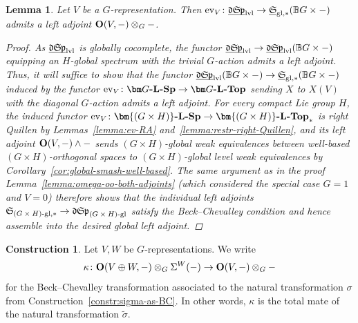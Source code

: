 \documentclass[reqno]{memo-l}
\theoremstyle{mythm}
\newtheorem{lemma}[thm]{Lemma}
\theoremstyle{definition}
\newtheorem{constr}[thm]{Construction}
\numberwithin{equation}{section}
\newcommand{\gl}{\textup{gl}}
\DeclareMathOperator{\ev}{ev}
\newcommand{\cat}[1]{\textbf{\textup{#1}}}
\newcommand{\BGcat}[1]{\mathbb B{#1}}
\newcommand{\ulhelper}[2]{\underline{\setbox0=\hbox{$#1#2$}\dp0=0.4pt \box0\relax}}
\newcommand{\ul}[1]{{\mathpalette\ulhelper{#1}}\hbox{\rule[-2pt]{0pt}{0pt}}}
\let\smashp=\wedge
\newcommand{\mySp}{{\mathfrak S\kern-.5pt\mathfrak p}}
\newcommand{\myLSp}{{\mathfrak d\kern-.25pt}\mySp}
\newcommand{\ulmySplev}{\ul{\myLSp}_\textup{lvl}}
\newcommand{\myS}{{{\mathfrak S\kern-.4pt}}}
\begin{document}
\begin{lemma}
    Let $V$ be a $G$-representation. Then $\ev_V\colon\ulmySplev\to\ul\myS_{\gl,*}({\BGcat{G}\times{-}})$ admits a left adjoint $\cat{O}(V,-)\otimes_G{-}$.
    \begin{proof}
        As $\ulmySplev$ is globally cocomplete, the functor $\ulmySplev\to\ulmySplev(\BGcat{G}\times-)$ equipping an $H$-global spectrum with the trivial $G$-action admits a left adjoint. Thus, it will suffice to show that the functor $\ulmySplev(\BGcat{G}\times-)\to\ul\myS_{\gl,*}(\BGcat{G}\times-)$ induced by the functor $\ev_V\colon\cat{$\bm G$-$\cat{L}$-Sp}\rightarrow\cat{$\bm G$-$\cat{L}$-Top}$ sending $X$ to $X(V)$ with the diagonal $G$-action admits a left adjoint. For every compact Lie group $H$, the induced functor $\ev_V\colon\cat{$\bm{(G\times H)}$-$\cat{L}$-Sp}\to\cat{$\bm{(G\times H)}$-$\cat{L}$-Top}_*$ is right Quillen by Lemmas~\ref{lemma:ev-RA} and~\ref{lemma:restr-right-Quillen}, and its left adjoint $\cat{O}(V,-)\smashp{-}$ sends $(G\times H)$-global weak equivalences between well-based $(G\times H)$-orthogonal spaces to $(G\times H)$-global level weak equivalences by Corollary~\ref{cor:global-smash-well-based}. The same argument as in the proof Lemma~\ref{lemma:omega-oo-both-adjoints} (which considered the special case $G=1$ and $V=0$) therefore shows that the individual left adjoints $\myS_{\text{$(G\times H)$-gl},*}\to\myLSp_\text{$(G\times H)$-gl}$ satisfy the Beck--Chevalley condition and hence assemble into the desired global left adjoint.
    \end{proof}
\end{lemma}

\begin{constr}
    Let $V,W$ be $G$-representations. We write 
    \[
        \kappa\colon\cat{O}(V\oplus W,-)\otimes_G\Sigma^W(-)\to\cat{O}(V,-)\otimes_G{-}
    \]
    for the Beck--Chevalley transformation associated to the natural transformation $\sigma$ from Construction~\ref{constr:sigma-as-BC}. In other words, $\kappa$ is the total mate of the natural transformation $\tilde\sigma$.
\end{constr}
\end{document}
